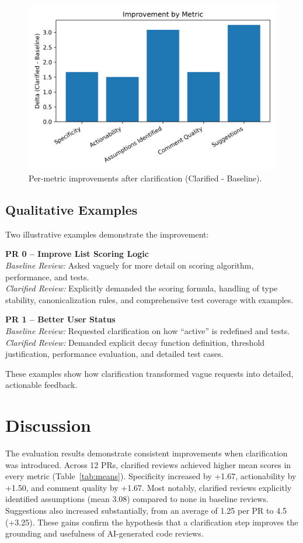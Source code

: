 \documentclass[conference]{IEEEtran}
\begin{document}
\begin{figure}[t]
  \centering
  \includegraphics[width=\linewidth]{../results/plots/fig_delta_bars.png}
  \caption{Per-metric improvements after clarification (Clarified - Baseline).}
  \label{fig:deltas}
\end{figure}


\subsection{Qualitative Examples}
Two illustrative examples demonstrate the improvement:

\textbf{PR 0 -- Improve List Scoring Logic}\\
\emph{Baseline Review:} Asked vaguely for more detail on scoring algorithm, performance, and tests.\\
\emph{Clarified Review:} Explicitly demanded the scoring formula, handling of type stability, canonicalization rules, and comprehensive test coverage with examples.

\textbf{PR 1 -- Better User Status}\\
\emph{Baseline Review:} Requested clarification on how ``active'' is redefined and tests.\\
\emph{Clarified Review:} Demanded explicit decay function definition, threshold justification, performance evaluation, and detailed test cases.

These examples show how clarification transformed vague requests into detailed, actionable feedback.

\section{Discussion}
The evaluation results demonstrate consistent improvements when clarification was introduced. Across 12 PRs, clarified reviews achieved higher mean scores in every metric (Table~\ref{tab:means}). Specificity increased by +1.67, actionability by +1.50, and comment quality by +1.67. Most notably, clarified reviews explicitly identified assumptions (mean 3.08) compared to none in baseline reviews. Suggestions also increased substantially, from an average of 1.25 per PR to 4.5 (+3.25). These gains confirm the hypothesis that a clarification step improves the grounding and usefulness of AI-generated code reviews.
\end{document}
